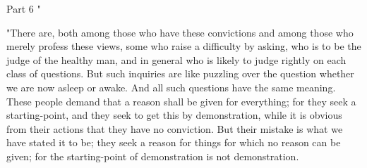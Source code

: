 Part 6 "

"There are, both among those who have these convictions and among
those who merely profess these views, some who raise a difficulty
by asking, who is to be the judge of the healthy man, and in general
who is likely to judge rightly on each class of questions. But such
inquiries are like puzzling over the question whether we are now asleep
or awake. And all such questions have the same meaning. These people
demand that a reason shall be given for everything; for they seek
a starting-point, and they seek to get this by demonstration, while
it is obvious from their actions that they have no conviction. But
their mistake is what we have stated it to be; they seek a reason
for things for which no reason can be given; for the starting-point
of demonstration is not demonstration. 

